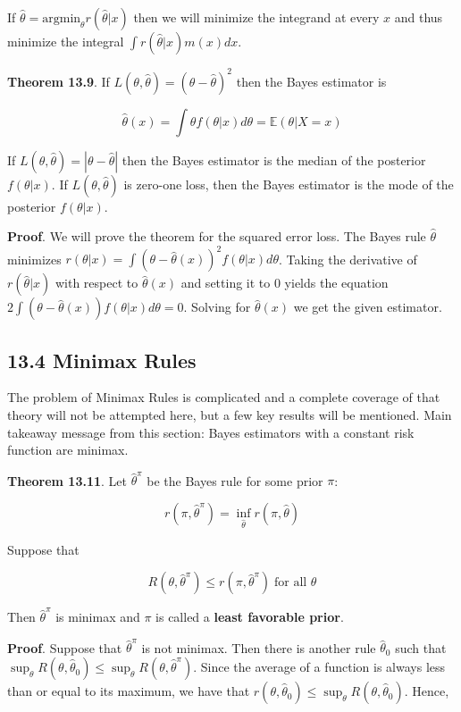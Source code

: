 If \(\hat{\theta} = \text{argmin}_\theta r(\hat{\theta} | x)\) then we
will minimize the integrand at every \(x\) and thus minimize the
integral \(\int r(\hat{\theta} | x)m(x) dx\).

\textbf{Theorem 13.9}. If
\(L(\theta, \hat{\theta}) = (\theta - \hat{\theta})^2\) then the Bayes
estimator is

\[\hat{\theta}(x) = \int \theta f(\theta | x) d\theta = \mathbb{E}(\theta | X = x)\]

If \(L(\theta, \hat{\theta}) = |\theta - \hat{\theta}|\) then the Bayes
estimator is the median of the posterior \(f(\theta | x)\). If
\(L(\theta, \hat{\theta})\) is zero-one loss, then the Bayes estimator
is the mode of the posterior \(f(\theta | x)\).

\textbf{Proof}. We will prove the theorem for the squared error loss.
The Bayes rule \(\hat{\theta}\) minimizes
\(r(\theta | x) = \int (\theta - \hat{\theta}(x))^2 f(\theta | x) d\theta\).
Taking the derivative of \(r(\hat{\theta} | x)\) with respect to
\(\hat{\theta}(x)\) and setting it to 0 yields the equation
\(2 \int (\theta - \hat{\theta}(x)) f(\theta | x) d\theta = 0\). Solving
for \(\hat{\theta}(x)\) we get the given estimator.

\subsection{13.4 Minimax Rules}\label{minimax-rules}

The problem of Minimax Rules is complicated and a complete coverage of
that theory will not be attempted here, but a few key results will be
mentioned. Main takeaway message from this section: Bayes estimators
with a constant risk function are minimax.

\textbf{Theorem 13.11}. Let \(\hat{\theta}^\pi\) be the Bayes rule for
some prior \(\pi\):

\[r(\pi, \hat{\theta}^\pi) = \inf_{\hat{\theta}} r(\pi, \hat{\theta})\]

Suppose that

\[R(\theta, \hat{\theta}^\pi) \leq r(\pi, \hat{\theta}^\pi) \;\text{for all } \theta\]

Then \(\hat{\theta}^\pi\) is minimax and \(\pi\) is called a
\textbf{least favorable prior}.

\textbf{Proof}. Suppose that \(\hat{\theta}^\pi\) is not minimax. Then
there is another rule \(\hat{\theta}_0\) such that
\(\sup_\theta R(\theta, \hat{\theta}_0) \leq \sup_\theta R(\theta, \hat{\theta}^\pi)\).
Since the average of a function is always less than or equal to its
maximum, we have that
\(r(\theta, \hat{\theta}_0) \leq \sup_\theta R(\theta, \hat{\theta}_0)\).
Hence,


